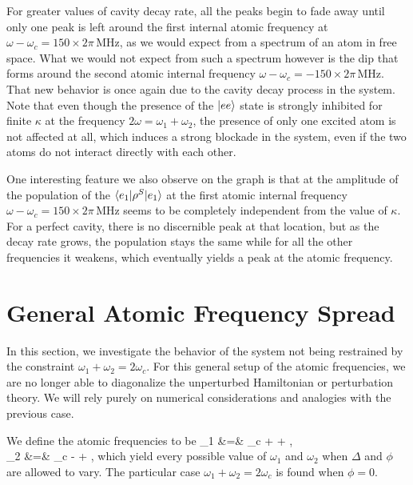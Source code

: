 For greater values of cavity decay rate, all the peaks begin to fade away until only one peak is left around the first internal atomic frequency at $\omega - \omega_c = 150 \times 2\pi\,\mbox{MHz}$, as we would expect from a spectrum of an atom in free space. What we would not expect from such a spectrum however is the dip that forms around the second atomic internal frequency  $\omega - \omega_c = -150 \times 2\pi\,\mbox{MHz}$. That new behavior is once again due to the cavity decay process in the system. Note that even though the presence of the $| ee \rangle$ state is strongly inhibited for finite $\kappa$ at the frequency $2\omega=\omega_1+\omega_2$, the presence of only one excited atom is not affected at all, which induces a strong blockade in the system, even if the two atoms do not interact directly with each other.

One interesting feature we also observe on the graph is that at the amplitude of the population of the $\langle e_1 | \rho^S | e_1 \rangle$ at the first atomic internal frequency $\omega - \omega_c = 150 \times 2\pi\,\mbox{MHz}$ seems to be completely independent from the value of $\kappa$. For a perfect cavity, there is no discernible peak at that location, but as the decay rate grows, the population stays the same while for all the other frequencies it weakens, which eventually yields a peak at the atomic frequency.



\section{General Atomic Frequency Spread}  \label{sec-phi}

In this section, we investigate the behavior of the system not being restrained by the constraint $\omega_1 + \omega_2 = 2 \omega_c$. For this general setup of the atomic frequencies, we are no longer able to diagonalize the unperturbed Hamiltonian or perturbation theory. We will rely purely on numerical considerations and analogies with the previous case.

We define the atomic frequencies to be
\bea
\omega_1 &=& \omega_c + \Delta + \phi, \\
\omega_2 &=& \omega_c - \Delta + \phi,
\eea
which yield every possible value of $\omega_1$ and $\omega_2$ when $\Delta$ and $\phi$ are allowed to vary. The particular case $\omega_1 + \omega_2 = 2 \omega_c$ is found when $\phi=0$.

